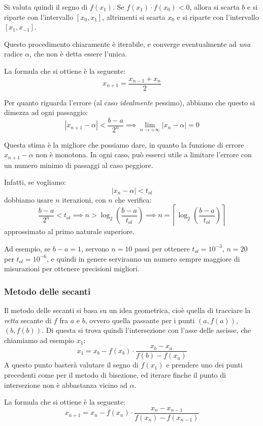 \documentclass[a4paper,11pt]{article}
\begin{document}
Si valuta quindi il segno di $f(x_1)$.
Se $f(x_1) \cdot f(x_0) < 0$, allora si scarta $b$ e si riparte con l'intervallo $[x_0, x_1]$, altrimenti si scarta $x_0$ e si riparte con l'intervallo $[x_1, x_{-1}]$.

Questo procedimento chiaramente è iterabile, e converge eventualmente ad \textit{una} radice $\alpha$, che non è detta essere l'unica.

La formula che si ottiene è la seguente:
$$
x_{n + 1} = \frac{x_{n - 1} + x_n}{2} 
$$

Per quanto riguarda l'errore (al caso \textit{idealmente} pessimo), abbiamo che questo si dimezza ad ogni passaggio:
$$
| x_{n + 1} - \alpha| < \frac{b - a}{2^n} \implies \lim_{n \rightarrow +\infty} |x_n - \alpha| = 0
$$

Questa stima è la migliore che possiamo dare, in quanto la funzione di errore $x_{n + 1} - \alpha$ non è monotona.
In ogni caso, può esserci utile a limitare l'errore con un numero minimo di passaggi al caso peggiore.

Infatti, se vogliamo:
$$
|x_n - \alpha| < t_{ol}
$$
dobbiamo usare $n$ iterazioni, con $n$ che verifica:
$$
\frac{b - a}{2^n} < t_{ol} \implies n > \log_2 \left( \frac{b - a}{t_{ol}} \right) \implies n = \left\lceil \log_2 \left( \frac{b - a}{t_{ol}} \right) \right\rceil
$$
approssimato al primo naturale superiore.

Ad esempio, se $b - a = 1$, servono $n = 10$ passi per ottenere $t_{ol} = 10^{-3}$, $n = 20$ per $t_{ol} = 10^{-6}$, e quindi in genere serviranno un numero sempre maggiore di misurazioni per ottenere precisioni migliori.

\subsubsection{Metodo delle secanti}
Il metodo delle secanti si basa su un idea geometrica, cioè quella di tracciare la \textit{retta} secante di $f$ fra $a$ e $b$, ovvero quella passante per i punti $(a, f(a))$, $(b, f(b))$.
Di questa si trova quindi l'intersezione con l'asse delle ascisse, che chiamiamo ad esempio $x_1$:
$$
x_1 = x_b - f(x_b) \cdot \frac{x_b - x_a}{f(b) - f(x_{a})}
$$
A questo punto basterà valutare il segno di $f(x_1)$ e prendere uno dei punti precedenti come per il metodo di bisezione, ed iterare finche il punto di intersezione non è abbastanza vicino ad $\alpha$.

La formula che si ottiene è la seguente:
$$
x_{n + 1} = x_n - f(x_n) \cdot \frac{x_n - x_{n - 1}}{f(x_n) - f(x_{n - 1})}
$$
\end{document}
